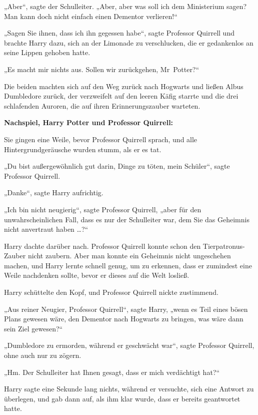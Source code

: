 {„Aber“, sagte der Schulleiter. „Aber, aber was soll ich dem Ministerium sagen? Man kann doch nicht einfach einen Dementor verlieren!“

„Sagen Sie ihnen, dass ich ihn gegessen habe“, sagte Professor Quirrell und brachte Harry dazu, sich an der Limonade zu verschlucken, die er gedankenlos an seine Lippen gehoben hatte.

„Es macht mir nichts aus. Sollen wir zurückgehen, Mr~Potter?“

Die beiden machten sich auf den Weg zurück nach Hogwarts und ließen Albus Dumbledore zurück, der verzweifelt auf den leeren Käfig starrte und die drei schlafenden Auroren, die auf ihren Erinnerungszauber warteten.

\textbf{Nachspiel, Harry Potter und Professor Quirrell:}

Sie gingen eine Weile, bevor Professor Quirrell sprach, und alle Hintergrundgeräusche wurden stumm, als er es tat.

„Du bist außergewöhnlich gut darin, Dinge zu töten, mein Schüler“, sagte Professor Quirrell.

„Danke“, sagte Harry aufrichtig.

„Ich bin nicht neugierig“, sagte Professor Quirrell, „aber für den unwahrscheinlichen Fall, dass es nur der Schulleiter war, dem Sie das Geheimnis nicht anvertraut haben …?“

Harry dachte darüber nach. Professor Quirrell konnte schon den Tierpatronus-Zauber nicht zaubern. Aber man konnte ein Geheimnis nicht ungeschehen machen, und Harry lernte schnell genug, um zu erkennen, dass er zumindest eine Weile nachdenken sollte, bevor er dieses auf die Welt losließ.

Harry schüttelte den Kopf, und Professor Quirrell nickte zustimmend.

„Aus reiner Neugier, Professor Quirrell“, sagte Harry, „wenn es Teil eines bösen Plans gewesen wäre, den Dementor nach Hogwarts zu bringen, was wäre dann sein Ziel gewesen?“

„Dumbledore zu ermorden, während er geschwächt war“, sagte Professor Quirrell, ohne auch nur zu zögern.

„Hm. Der Schulleiter hat Ihnen gesagt, dass er mich verdächtigt hat?“

Harry sagte eine Sekunde lang nichts, während er versuchte, sich eine Antwort zu überlegen, und gab dann auf, als ihm klar wurde, dass er bereits geantwortet hatte.

}
